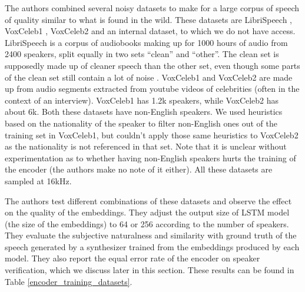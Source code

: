 \documentclass[a4paper, oneside, 12pt, english]{article}
\begin{document}
The authors combined several noisy datasets to make for a large corpus of speech of quality similar to what is found in the wild. These datasets are LibriSpeech \citep{LibriSpeech}, VoxCeleb1 \citep{VoxCeleb1}, VoxCeleb2 \citep{VoxCeleb2} and an internal dataset, to which we do not have access. LibriSpeech is a corpus of audiobooks making up for 1000 hours of audio from 2400 speakers, split equally in two sets ``clean'' and ``other''. The clean set is supposedly made up of cleaner speech than the other set, even though some parts of the clean set still contain a lot of noise \citep{LibriTTS}. VoxCeleb1 and VoxCeleb2 are made up from audio segments extracted from youtube videos of celebrities (often in the context of an interview). VoxCeleb1 has 1.2k speakers, while VoxCeleb2 has about 6k. Both these datasets have non-English speakers. We used heuristics based on the nationality of the speaker to filter non-English ones out of the training set in VoxCeleb1, but couldn't apply those same heuristics to VoxCeleb2 as the nationality is not referenced in that set. Note that it is unclear without experimentation as to whether having non-English speakers hurts the training of the encoder (the authors make no note of it either). All these datasets are sampled at 16kHz.

The authors test different combinations of these datasets and observe the effect on the quality of the embeddings. They adjust the output size of LSTM model (the size of the embeddings) to 64 or 256 according to the number of speakers. They evaluate the subjective naturalness and similarity with ground truth of the speech generated by a synthesizer trained from the embeddings produced by each model. They also report the equal error rate of the encoder on speaker verification, which we discuss later in this section. These results can be found in Table \ref{encoder_training_datasets}.
\end{document}

